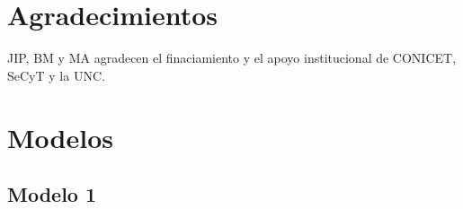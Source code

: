 \documentclass[aps,prl,preprint,groupedaddress]{revtex4-2}
\begin{document}



\section{Agradecimientos}

\begin{acknowledgments}
JIP, BM y MA agradecen el finaciamiento y el apoyo institucional de CONICET, SeCyT y la UNC.
\end{acknowledgments}



\onecolumngrid

\appendix

\section{Modelos}

\subsection{Modelo 1}
\end{document}
